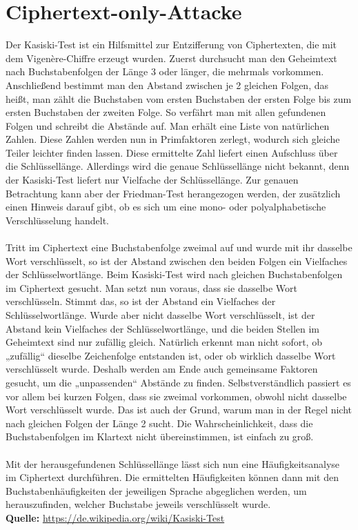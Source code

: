 \documentclass[12pt, a4paper]{article}
\begin{document}
\section{Ciphertext-only-Attacke}
Der Kasiski-Test ist ein Hilfsmittel zur Entzifferung von Ciphertexten, die mit dem Vigenère-Chiffre erzeugt wurden.
Zuerst durchsucht man den Geheimtext nach Buchstabenfolgen der Länge 3 oder länger, die mehrmals vorkommen. Anschließend bestimmt man den Abstand zwischen je 2 gleichen Folgen, das heißt, man zählt die Buchstaben vom ersten Buchstaben der ersten Folge bis zum ersten Buchstaben der zweiten Folge. So verfährt man mit allen gefundenen Folgen und schreibt die Abstände auf. Man erhält eine Liste von natürlichen Zahlen. Diese Zahlen werden nun in Primfaktoren zerlegt, wodurch sich gleiche Teiler leichter finden lassen. Diese ermittelte Zahl liefert einen Aufschluss über die Schlüssellänge. Allerdings wird die genaue Schlüssellänge nicht bekannt, denn der Kasiski-Test liefert nur Vielfache der Schlüssellänge. Zur genauen Betrachtung kann aber der Friedman-Test herangezogen werden, der zusätzlich einen Hinweis darauf gibt, ob es sich um eine mono- oder polyalphabetische Verschlüsselung handelt.
\\
\\
Tritt im Ciphertext eine Buchstabenfolge zweimal auf und wurde mit ihr dasselbe Wort verschlüsselt, so ist der Abstand zwischen den beiden Folgen ein Vielfaches der Schlüsselwortlänge. Beim Kasiski-Test wird nach gleichen Buchstabenfolgen im Ciphertext gesucht. Man setzt nun voraus, dass sie dasselbe Wort verschlüsseln. Stimmt das, so ist der Abstand ein Vielfaches der Schlüsselwortlänge. Wurde aber nicht dasselbe Wort verschlüsselt, ist der Abstand kein Vielfaches der Schlüsselwortlänge, und die beiden Stellen im Geheimtext sind nur zufällig gleich. Natürlich erkennt man nicht sofort, ob „zufällig“ dieselbe Zeichenfolge entstanden ist, oder ob wirklich dasselbe Wort verschlüsselt wurde. Deshalb werden am Ende auch gemeinsame Faktoren gesucht, um die „unpassenden“ Abstände zu finden. Selbstverständlich passiert es vor allem bei kurzen Folgen, dass sie zweimal vorkommen, obwohl nicht dasselbe Wort verschlüsselt wurde. Das ist auch der Grund, warum man in der Regel nicht nach gleichen Folgen der Länge 2 sucht. Die Wahrscheinlichkeit, dass die Buchstabenfolgen im Klartext nicht übereinstimmen, ist einfach zu groß.
\\
\\
Mit der herausgefundenen Schlüssellänge lässt sich nun eine Häufigkeitsanalyse im Ciphertext durchführen. Die ermittelten Häufigkeiten können dann mit den Buchstabenhäufigkeiten der jeweiligen Sprache abgeglichen werden, um herauszufinden, welcher Buchstabe jeweils verschlüsselt wurde.
\\
\textbf{Quelle:}
\url{https://de.wikipedia.org/wiki/Kasiski-Test}
\end{document}
